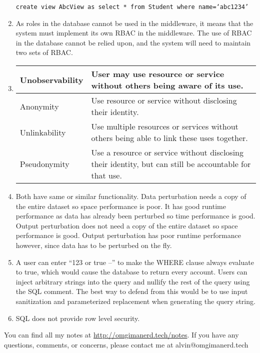 \documentclass{math}
\begin{document}
\begin{enumerate}
  \texttt{create view AbcView as select * from Student where name=`abc1234'}
  \item As roles in the database cannot be used in the middleware, it means that
  the system must implement its own RBAC in the middleware. The use of RBAC in
  the database cannot be relied upon, and the system will need to maintain two
  sets of RBAC.
  \item
  \begin{tabular}{|m{3cm}|p{10cm}|}
    \hline
    Unobservability & User may use resource or service without others being
      aware of its use. \\
    \hline
    Anonymity & Use resource or service without disclosing their identity. \\
    \hline
    Unlinkability & Use multiple resources or services without others being
      able to link these uses together. \\
    \hline
    Pseudonymity & Use a resource or service without disclosing their
    identity, but can still be accountable for that use. \\
    \hline
  \end{tabular}
  \item Both have same or similar functionality. Data perturbation needs a copy
  of the entire dataset so space performance is poor. It has good runtime
  performance as data has already been perturbed so time performance is good.
  Output perturbation does not need a copy of the entire dataset so space
  performance is good. Output perturbation has poor runtime performance however,
  since data has to be perturbed on the fly.
  \item A user can enter ``123 or true --'' to make the WHERE clause always
  evaluate to true, which would cause the database to return every account.
  Users can inject arbitrary strings into the query and nullify the rest of the
  query using the SQL comment. The best way to defend from this would be to
  use input sanitization and parameterized replacement when generating the
  query string.
  \item SQL does not provide row level security.
\end{enumerate}

\begin{center}
  You can find all my notes at \url{http://omgimanerd.tech/notes}. If you have
  any questions, comments, or concerns, please contact me at
  alvin@omgimanerd.tech
\end{center}
\end{document}
